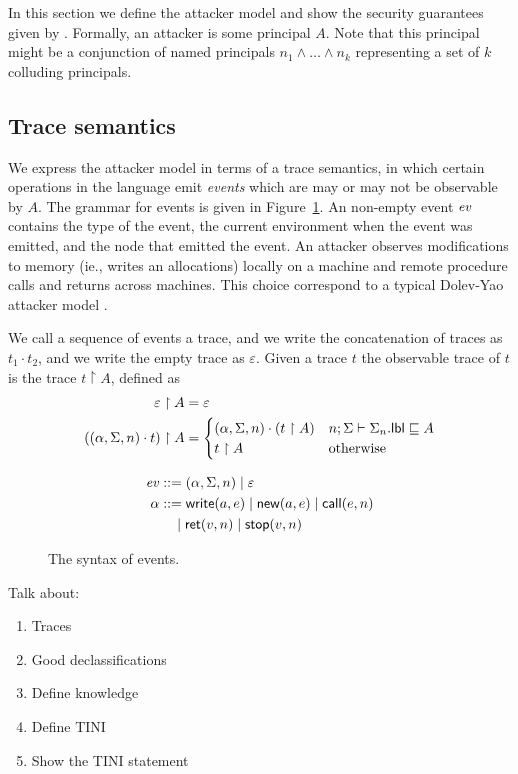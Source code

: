 In this section we define the attacker model and show the security guarantees given by \lang. Formally, an attacker is some principal $A$. Note that this principal might be a conjunction of named principals $n_1 \wedge \dots \wedge n_k$ representing a set of $k$ colluding principals.

\subsection{Trace semantics}
We express the attacker model in terms of a trace semantics, in which certain operations in the language emit \emph{events} which are may or may not be observable by $A$. The grammar for events is given in Figure~\ref{fig:event-syntax}. An non-empty event $\mathit{ev}$ contains the type of the event, the current environment when the event was emitted, and the node that emitted the event. An attacker observes modifications to memory (ie., writes an allocations) locally on a machine and remote procedure calls and returns across machines. This choice correspond to a typical Dolev-Yao attacker model \cite{Dolev:1981:SPK:1382435.1382728}.

We call a sequence of events a trace, and we write the concatenation of traces as $t_1 \cdot t_2$, and we write the empty trace as $\varepsilon$. Given a trace $t$ the observable trace of $t$ is the trace $t \upharpoonright A$, defined as
\begin{align*}
\varepsilon \upharpoonright A &= \varepsilon\\
((\alpha, \Sigma, n) \cdot t) \upharpoonright A &=
\begin{cases}
(\alpha, \Sigma, n) \cdot (t \upharpoonright A) & n; \Sigma \vdash \Sigma_n.\mathsf{lbl} \sqsubseteq A \\
t \upharpoonright A & \text{otherwise}
\end{cases}
\end{align*}

\begin{figure}
\centering
\begin{align*}
\mathit{ev} &::= (\alpha, \Sigma, n) \mid \varepsilon\\
\alpha &::= \mathsf{write}(a, e) \mid \mathsf{new}(a, e) \mid \mathsf{call}(e, n) \\ &\quad \mid \mathsf{ret}(v, n) \mid \mathsf{stop}(v, n)
\end{align*}
\caption{The syntax of events.}
\label{fig:event-syntax}
\end{figure}

Talk about:
\begin{enumerate}
    \item Traces
    \item Good declassifications
    \item Define knowledge
    \item Define TINI
    \item Show the TINI statement
\end{enumerate}